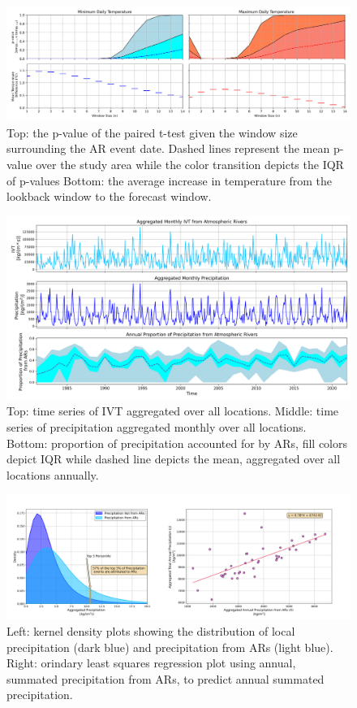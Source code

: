 \documentclass[draft]{AR_analysis_}
\begin{document}
\begin{figure}
\centering
\includegraphics[width=1.0\textwidth]{./images/tmin_vs_tmax_subplots.png}
\caption{Top: the p-value of the paired t-test given the
	window size surrounding the AR event date. Dashed lines
	represent the mean p-value over the study area while the color
	transition depicts the IQR of p-values Bottom: the average increase
	in temperature from the lookback window to the forecast window.}
\label{fig:tmin_vs_tmax_subplots} 
\end{figure}

\begin{figure}
\centering
\includegraphics[width=1.0\textwidth]{./images/IVT_Precip_proportion_over_time.png}
\caption{Top: time series of IVT aggregated over all locations.
	Middle: time series of precipitation aggregated monthly over all
	locations. Bottom: proportion of precipitation accounted for by
	ARs, fill colors depict IQR while dashed line depicts the mean,
	aggregated over all locations annually. }
\label{fig:IVT_Precip_proportion_over_time}
\end{figure}

\begin{figure}
\centering
\includegraphics[width=1.0\textwidth]{./images/concatenated_precip_var_plots.png}
\caption{Left: kernel density plots showing the distribution of
	local precipitation (dark blue) and precipitation from ARs
	(light blue). Right: orindary least squares regression plot
	using annual, summated precipitation from ARs, to predict annual
	summated precipitation.}
\label{fig:concatenated_precip_var_plots}
\end{figure}
\end{document}
